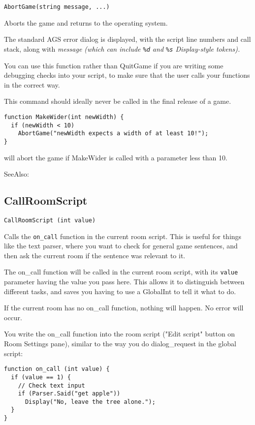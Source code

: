 \begin{verbatim}
AbortGame(string message, ...)
\end{verbatim}
Aborts the game and returns to the operating system.

The standard AGS error dialog is displayed, with the script line numbers and call stack,
along with \it{message} (which can include \verb$%d$ and \verb$%s$ Display-style tokens).

You can use this function rather than QuitGame if you are writing some debugging checks
into your script, to make sure that the user calls your functions in the correct way.

This command should ideally never be called in the final release of a game.

\begin{verbatim}
function MakeWider(int newWidth) {
  if (newWidth < 10)
    AbortGame("newWidth expects a width of at least 10!");
}
\end{verbatim}
will abort the game if MakeWider is called with a parameter less than 10.

SeeAlso: 


\subsection{CallRoomScript}\label{CallRoomScript}%

\begin{verbatim}
CallRoomScript (int value)
\end{verbatim}

Calls the \verb$on_call$ function in the current room script. This is useful for things
like the text parser, where you want to check for general game sentences, and then ask
the current room if the sentence was relevant to it.

The on_call function will be called in the current room script, with its \verb$value$
parameter having the value you pass here. This allows it to distinguish between different
tasks, and saves you having to use a GlobalInt to tell it what to do.

If the current room has no on_call function, nothing will happen. No error will occur.

You write the on_call function into the room script ("Edit script" button on Room Settings
pane), similar to the way you do dialog_request in the global script:
\begin{verbatim}
function on_call (int value) {
  if (value == 1) {
    // Check text input
    if (Parser.Said("get apple"))
      Display("No, leave the tree alone.");
  }
}
\end{verbatim}

